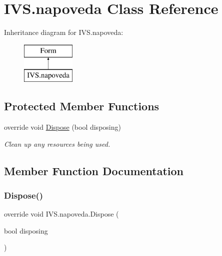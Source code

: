 \hypertarget{class_i_v_s_1_1napoveda}{}\section{I\+V\+S.\+napoveda Class Reference}
\label{class_i_v_s_1_1napoveda}
Inheritance diagram for I\+V\+S.\+napoveda\+:\begin{figure}[H]
\begin{center}
\leavevmode
\includegraphics[height=2.000000cm]{class_i_v_s_1_1napoveda}
\end{center}
\end{figure}
\subsection*{Protected Member Functions}
\begin{DoxyCompactItemize}
\item 
override void \mbox{\hyperlink{class_i_v_s_1_1napoveda_aeec632e7bb98b05061ff7ab39373ef4b}{Dispose}} (bool disposing)
\begin{DoxyCompactList}\small\item\em Clean up any resources being used. \end{DoxyCompactList}\end{DoxyCompactItemize}


\subsection{Member Function Documentation}
\mbox{\label{class_i_v_s_1_1napoveda_aeec632e7bb98b05061ff7ab39373ef4b}} 
\subsubsection{\texorpdfstring{Dispose()}{Dispose()}}
{\footnotesize\ttfamily override void I\+V\+S.\+napoveda.\+Dispose (\begin{DoxyParamCaption}\item[{bool}]{disposing }\end{DoxyParamCaption})\hspace{0.3cm}{\ttfamily [protected]}}



